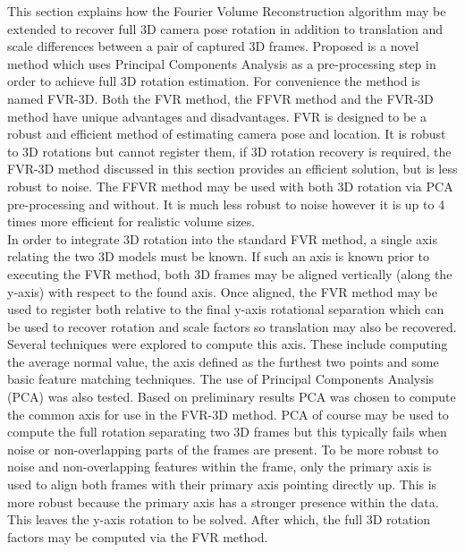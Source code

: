 \label{FullRecovery3DSection}


This section explains how the Fourier Volume Reconstruction algorithm may be extended to recover full 3D camera pose rotation in addition to translation and scale differences between a pair of captured 3D frames. Proposed is a novel method which uses Principal Components Analysis as a pre-processing step in order to achieve full 3D rotation estimation. For convenience the method is named FVR-3D. Both the FVR method, the FFVR method and the FVR-3D method have unique advantages and disadvantages. FVR is designed to be a robust and efficient method of estimating camera pose and location. It is robust to 3D rotations but cannot register them, if 3D rotation recovery is required, the FVR-3D method discussed in this section provides an efficient solution, but is less robust to noise. The FFVR method may be used with both 3D rotation via PCA pre-processing and without. It is much less robust to noise however it is up to 4 times more efficient for realistic volume sizes. \\

In order to integrate 3D rotation into the standard FVR method, a single axis relating the two 3D models must be known. If such an axis is known prior to executing the FVR method, both 3D frames may be aligned vertically (along the y-axis) with respect to the found axis. Once aligned, the FVR method may be used to register both relative to the final y-axis rotational separation which can be used to recover rotation and scale factors so translation may also be recovered. \\

Several techniques were explored to compute this axis. These include computing the average normal value, the axis defined as the furthest two points and some basic feature matching techniques. The use of Principal Components Analysis (PCA) was also tested. Based on preliminary results PCA was chosen to compute the common axis for use in the FVR-3D method. PCA of course may be used to compute the full rotation separating two 3D frames but this typically fails when noise or non-overlapping parts of the frames are present. To be more robust to noise and non-overlapping features within the frame, only the primary axis is used to align both frames with their primary axis pointing directly up. This is more robust because the primary axis has a stronger presence within the data. This leaves the y-axis rotation to be solved. After which, the full 3D rotation factors may be computed via the FVR method. \\ 

